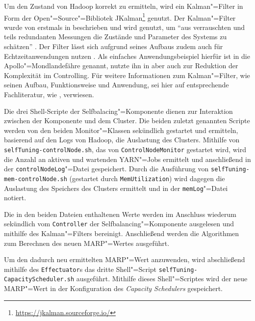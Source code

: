 Um den Zustand von Hadoop korrekt zu ermitteln, wird ein Kalman"=Filter in Form der Open"=Source"=Bibliotek JKalman\footnote{\url{https://jkalman.sourceforge.io/}} genutzt.
Der Kalman"=Filter wurde von \citeauthor{Kalman1960} erstmals in \cite{Kalman1960} beschrieben und wird genutzt, um \enquote{aus verrauschten und teils redundanten Messungen die Zustände und Parameter des Systems zu schätzen} \cite{Marchthaler2017}.
Der Filter lässt sich aufgrund seines Aufbaus zudem auch für Echtzeitanwendungen nutzen \cite{Marchthaler2017}.
Als einfaches Anwendungsbeispiel hierfür ist in \cite{Marchthaler2017} die Apollo"=Mondlandefähre genannt, \citeauthor{Strukov2001} nutzte ihn in \cite{Strukov2001} aber auch zur Reduktion der Komplexität im Controlling.
Für weitere Informationen zum Kalman"=Filter, wie seinen Aufbau, Funktionsweise und Anwendung, sei hier auf entsprechende Fachliteratur, wie \zB \cite{Kim2016,Simon2006,Aggoun2004}, verwiesen.

Die drei Shell-Scripte der Selfbalacing"=Komponente dienen zur Interaktion zwischen der Komponente und dem Cluster.
Die beiden zuletzt genannten Scripte werden von den beiden Monitor"=Klassen sekündlich gestartet und ermitteln, basierend auf den Logs von Hadoop, die Auslastung des Clusters.
Mithilfe von \texttt{selfTuning-controlNode.sh}, das von \texttt{ControlNodeMonitor} gestartet wird, wird die Anzahl an aktiven und wartenden YARN"=Jobs ermittelt und anschließend in der \texttt{controlNodeLog}"=Datei gespeichert.
Durch die Ausführung von \texttt{selfTuning-mem-controlNode.sh} (gestartet durch \texttt{MemUtilization}) wird dagegen die Auslastung des Speichers des Clusters ermittelt und in der \texttt{memLog}"=Datei notiert.

Die in den beiden Dateien enthaltenen Werte werden im Anschluss wiederum sekündlich vom \texttt{Controller} der Selfbalancing"=Komponente ausgelesen und mithilfe des Kalman"=Filters bereinigt.
Anschließend werden die Algorithmen \cite{Zhang2016} zum Berechnen des neuen \gls{MARP}"=Wertes ausgeführt.

Um den dadurch neu ermittelten \gls{MARP}"=Wert anzuwenden, wird abschließend mithilfe des \texttt{Effectuator}s das dritte Shell"=Script \texttt{selfTuning-CapacityScheduler.sh} ausgeführt.
Mithilfe dieses Shell"=Scriptes wird der neue MARP"=Wert in der Konfiguration des \emph{Capacity Schedulers} gespeichert.

